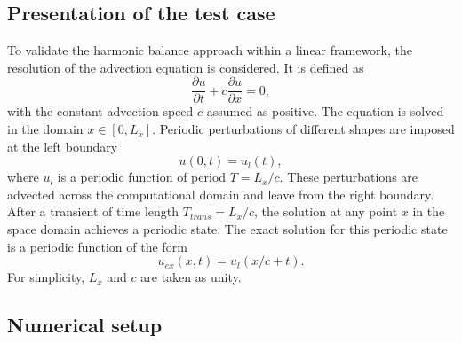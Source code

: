 
\subsection{Presentation of the test case}
\label{sec:presentation_advection}

To validate the harmonic balance approach within a 
linear framework, the resolution of the
advection equation is considered. It is defined as
\begin{equation}
  \label{eq:convection}
  \frac{\partial u}{\partial t} + c \frac{\partial u}{\partial x} = 0,
\end{equation}
with the constant advection speed $c$ assumed as positive. 
The equation is solved in the domain $x \in [0, L_x]$. 
Periodic perturbations of different shapes are imposed at the left boundary
\begin{equation}
   u(0, t) = u_l (t),
\end{equation}
where $u_l$ is a periodic function of period $T=L_x/c$.
These perturbations are advected across the computational 
domain and leave from the right boundary. After a transient of time length $T_{trans}=L_x/c$, 
the solution at any point $x$ in the space domain achieves a periodic state. 
The exact solution for this periodic state is a periodic function of the form
\begin{equation}
    u_{ex}(x,t)=u_l(x/c+t).
\end{equation}
For simplicity, $L_x$ and $c$ are taken as unity.

\subsection{Numerical setup}

